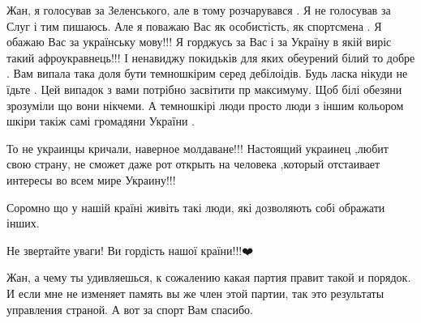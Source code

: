\begin{itemize}
 

Жан, я голосував за Зеленського, але в тому розчарувався . Я не голосував за
Слуг і тим пишаюсь. Але я поважаю Вас як особистість, як спортсмена . Я обажаю
Вас за українську мову!!! Я горджусь за Вас і за Україну в якій виріс такий
афроукравнець!!! І ненавиджу покидьків для яких обеурений білий то добре . Вам
випала така доля бути темношкірим серед дебілоідів. Будь ласка нікуди не їдьте
. Цей випадок з вами потрібно засвітити пр максимуму. Щоб білі обезяни
зрозуміли що вони нікчеми. А темношкірі люди просто люди з іншим кольором шкіри
такіж самі громадяни України .

 

То не украинцы кричали, наверное молдаване!!! Настоящий украинец ,любит свою
страну, не сможет даже рот открыть на человека ,который отстаивает интересы во
всем мире Украину!!!


 

Соромно що у нашій країні живіть такі люди, які дозволяють собі ображати інших.

Не звертайте уваги! Ви гордість нашої країни!!!❤️


 

Жан, а чему ты удивляешься, к сожалению какая партия правит такой и порядок. И
если мне не изменяет память вы же член этой партии, так это результаты
управления страной. А вот за спорт Вам спасибо.

 


\end{itemize}
